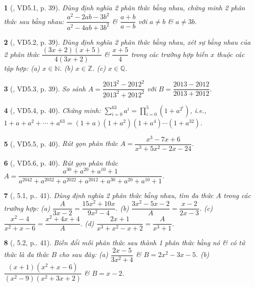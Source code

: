 \documentclass{article}
\newtheorem{baitoan}{}
\begin{document}
\begin{baitoan}[\cite{TLCT_THCS_Toan_8_dai_so}, VD5.1, p. 39]
	Dùng định nghĩa 2 phân thức bằng nhau, chứng minh 2 phân thức sau bằng nhau: $\dfrac{a^2 - 2ab - 3b^2}{a^2 - 4ab + 3b^2}$ \& $\dfrac{a + b}{a - b}$ với $a\ne b$ \& $a\ne 3b$.
\end{baitoan}

\begin{baitoan}[\cite{TLCT_THCS_Toan_8_dai_so}, VD5.2, p. 39]
	Dùng định nghĩa 2 phân thức bằng nhau, xét sự bằng nhau của 2 phân thức $\dfrac{(3x + 2)(x + 5)}{4(3x + 2)}$ \& $\dfrac{x + 5}{4}$ trong các trường hợp biến $x$ thuộc các tập hợp: (a) $x\in\mathbb{N}$. (b) $x\in\mathbb{Z}$. (c) $x\in\mathbb{Q}$.
\end{baitoan}

\begin{baitoan}[\cite{TLCT_THCS_Toan_8_dai_so}, VD5.3, p. 39]
	So sánh $A = \dfrac{2013^2 - 2012^2}{2013^2 + 2012^2}$ với $B = \dfrac{2013 - 2012}{2013 + 2012}$.
\end{baitoan}

\begin{baitoan}[\cite{TLCT_THCS_Toan_8_dai_so}, VD5.4, p. 40]
	Chứng minh: $\sum_{i=0}^{63} a^i = \prod_{i=0}^{5} (1 + a^{2^i})$, i.e., $1 + a + a^2 + \cdots + a^{63} = (1 + a)(1 + a^2)(1 + a^4)\cdots(1 + a^{32})$.
\end{baitoan}

\begin{baitoan}[\cite{TLCT_THCS_Toan_8_dai_so}, VD5.5, p. 40]
	Rút gọn phân thức $A = \dfrac{x^3 - 7x + 6}{x^3 + 5x^2 - 2x - 24}$.
\end{baitoan}

\begin{baitoan}[\cite{TLCT_THCS_Toan_8_dai_so}, VD5.6, p. 40]
	Rút gọn phân thức $A = \dfrac{a^{30} + a^{20} + a^{10} + 1}{a^{2042} + a^{2032} + a^{2022} + a^{2012} + a^{30} + a^{20} + a^{10} + 1}$.
\end{baitoan}

\begin{baitoan}[\cite{TLCT_THCS_Toan_8_dai_so}, 5.1, p.. 41]
	Dùng định nghĩa 2 phân thức bằng nhau, tìm đa thức $A$ trong các trường hợp: (a) $\dfrac{A}{3x - 2} = \dfrac{15x^2 + 10x}{9x^2 - 4}$. (b) $\dfrac{3x^2 - 5x - 2}{A} = \dfrac{x - 2}{2x - 3}$. (c) $\dfrac{x^2 - 4}{x^2 + x - 6} = \dfrac{x^2 + 4x + 4}{A}$. (d) $\dfrac{2x + 1}{x^3 + x^2 - x + 2} = \dfrac{A}{x^3 + 1}$.
\end{baitoan}

\begin{baitoan}[\cite{TLCT_THCS_Toan_8_dai_so}, 5.2, p.. 41]
	Biến đổi mỗi phân thức sau thành 1 phân thức bằng nó \& có tử thức là đa thức $B$ cho sau đây: (a) $\dfrac{2x - 5}{3x^2 + 4}$ \& $B = 2x^2 - 3x - 5$. (b) $\dfrac{(x + 1)(x^2 + x - 6)}{(x^2 - 9)(x^2 + 3x + 2)}$ \& $B = x - 2$.
\end{baitoan}
\end{document}
